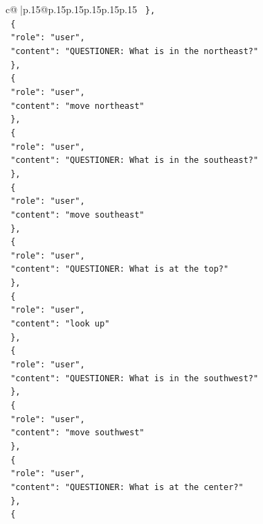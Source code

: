 \documentclass{article}
\begin{document}
{\begin{supertabular}{c@{$\;$}|p{.15\linewidth}@{}p{.15\linewidth}p{.15\linewidth}p{.15\linewidth}p{.15\linewidth}p{.15\linewidth}}
{{{\texttt{  \},} \\
\texttt{  \{} \\
\texttt{    "role": "user",} \\
\texttt{    "content": "QUESTIONER: What is in the northeast?"} \\
\texttt{  \},} \\
\texttt{  \{} \\
\texttt{    "role": "user",} \\
\texttt{    "content": "move northeast"} \\
\texttt{  \},} \\
\texttt{  \{} \\
\texttt{    "role": "user",} \\
\texttt{    "content": "QUESTIONER: What is in the southeast?"} \\
\texttt{  \},} \\
\texttt{  \{} \\
\texttt{    "role": "user",} \\
\texttt{    "content": "move southeast"} \\
\texttt{  \},} \\
\texttt{  \{} \\
\texttt{    "role": "user",} \\
\texttt{    "content": "QUESTIONER: What is at the top?"} \\
\texttt{  \},} \\
\texttt{  \{} \\
\texttt{    "role": "user",} \\
\texttt{    "content": "look up"} \\
\texttt{  \},} \\
\texttt{  \{} \\
\texttt{    "role": "user",} \\
\texttt{    "content": "QUESTIONER: What is in the southwest?"} \\
\texttt{  \},} \\
\texttt{  \{} \\
\texttt{    "role": "user",} \\
\texttt{    "content": "move southwest"} \\
\texttt{  \},} \\
\texttt{  \{} \\
\texttt{    "role": "user",} \\
\texttt{    "content": "QUESTIONER: What is at the center?"} \\
\texttt{  \},} \\
\texttt{  \{} \\
}}}
\end{supertabular}}
\end{document}
